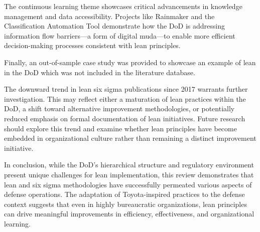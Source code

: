 \documentclass{article}
\begin{document}
		The continuous learning theme showcases critical advancements in knowledge management and data accessibility.
		Projects like Rainmaker and the Classification Automation Tool demonstrate how the DoD is addressing information flow barriers—a form of digital muda—to enable more efficient decision-making processes consistent with lean principles.

		Finally, an out-of-sample case study was provided to showcase an example of lean in the DoD which was not included in the literature database. 

		The downward trend in lean six sigma publications since 2017 warrants further investigation. 
		This may reflect either a maturation of lean practices within the DoD, a shift toward alternative improvement methodologies, or potentially reduced emphasis on formal documentation of lean initiatives. 
		Future research should explore this trend and examine whether lean principles have become embedded in organizational culture rather than remaining a distinct improvement initiative.

		In conclusion, while the DoD's hierarchical structure and regulatory environment present unique challenges for lean implementation, this review demonstrates that lean and six sigma methodologies have successfully permeated various aspects of defense operations. 
		The adaptation of Toyota-inspired practices to the defense context suggests that even in highly bureaucratic organizations, lean principles can drive meaningful improvements in efficiency, effectiveness, and organizational learning.

	\newpage

	
	\nocite{*}
	
\end{document}
